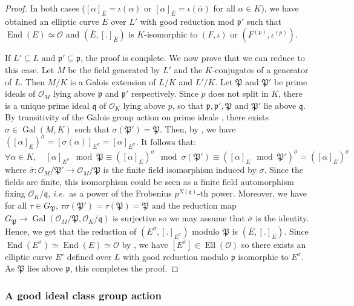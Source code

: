 \documentclass[a4paper,10pt]{report}
\theoremstyle{definition}
\theoremstyle{plain}
\theoremstyle{definition}
\newcommand{\ie}{\emph{i.e.}\ }
\newcommand{\mO}{\mathcal{O}}
\renewcommand{\(}{\left(}
\renewcommand{\)}{\right)}
\newcommand{\mf}[1]{\mathfrak{#1}}
\newcommand{\mfp}{\mathfrak{p}}
\newcommand{\mfq}{\mathfrak{q}}
\DeclareMathOperator{\End}{End}
\DeclareMathOperator{\Ell}{Ell}
\DeclareMathOperator{\Gal}{Gal}
\begin{document}
\begin{proof}
In both cases ($[\alpha]_{\overline{E}}=\iota(\alpha)$ or $[\alpha]_{\overline{E}}=\iota(\overline{\alpha})$ for all $\alpha\in K$), we have obtained an elliptic curve $E$ over $L'$ with good reduction mod $\mfp'$ such that $\End(E)\simeq \mO$ and $(\overline{E},[.]_{\overline{E}})$ is $K$-isomorphic to $(F,\iota)$ or $(F^{(p)},\iota^{(p)})$. 

If $L'\subseteq L$ and $\mfp'\subseteq\mfp$, the proof is complete. We now prove that we can reduce to this case. Let $M$ be the field generated by $L'$ and the $K$-conjugates of a generator of $L$. Then $M/K$ is a Galois extension of $L/K$ and $L'/K$.  Let $\mf{P}$ and $\mf{P}'$ be prime ideals of $\mO_M$ lying above $\mfp$ and $\mfp'$ respectively. Since $p$ does not split in $K$, there is a unique prime ideal $\mfq$ of $\mO_K$ lying above $p$, so that $\mfp, \mfp', \mf{P}$ and $\mf{P}'$ lie above $\mfq$. By transitivity of the Galois group action on prime ideals \cite[proposition I.11]{Lang_ANT}, there exists $\sigma\in\Gal(M,K)$ such that $\sigma(\mf{P}')=\mf{P}$.  Then, by \cite[theorem II.2.2.(a)]{Silverman2}, we have $([\alpha]_E)^\sigma=[\sigma(\alpha)]_{E^\sigma}=[\alpha]_{E^\sigma}$. It follows that:
\[\forall\alpha\in K, \quad [\alpha]_{E^\sigma} \mod\mf{P}\equiv ([\alpha]_E)^\sigma \mod\sigma(\mf{P}')\equiv \([\alpha]_E \mod\mf{P}'\)^{\overline{\sigma}}= ([\alpha]_{\overline{E}})^{\overline{\sigma}}\]
where $\overline{\sigma} :\mO_M/\mf{P}'\longrightarrow\mO_M/\mf{P}$ is the finite field isomorphism induced by $\sigma$. Since the fields are finite, this isomorphism could be seen as a finite field automorphism fixing $\mO_K/\mfq$, \ie as a power of the Frobenius $p^{N(\mfq)}$-th power. Moreover, we have for all $\tau\in G_{\mf{P}}$, $\tau\sigma(\mf{P}')=\tau(\mf{P})=\mf{P}$ and the reduction map $G_{\mf{P}}\longrightarrow\Gal(\mO_M/\mf{P},\mO_K/\mfq)$ is surjective so we may assume that $\overline{\sigma}$ is the identity.  Hence, 
we get that the reduction of $(E^{\sigma},[.]_{E^\sigma})$ modulo $\mf{P}$ is $(\overline{E},[.]_{\overline{E}})$. Since $\End(E^{\sigma})\simeq\End(E)\simeq \mO$ by \cite[proposition II.2.1]{Silverman2}, we have $[E^\sigma]\in\Ell(\mO)$ so there exists an elliptic curve $E'$ defined over $L$ with good reduction modulo $\mfp$ isomorphic to $E^\sigma$.  As $\mf{P}$ lies above $\mfp$, this completes the proof.
\end{proof}

\subsubsection{A good ideal class group action}
\end{document}
